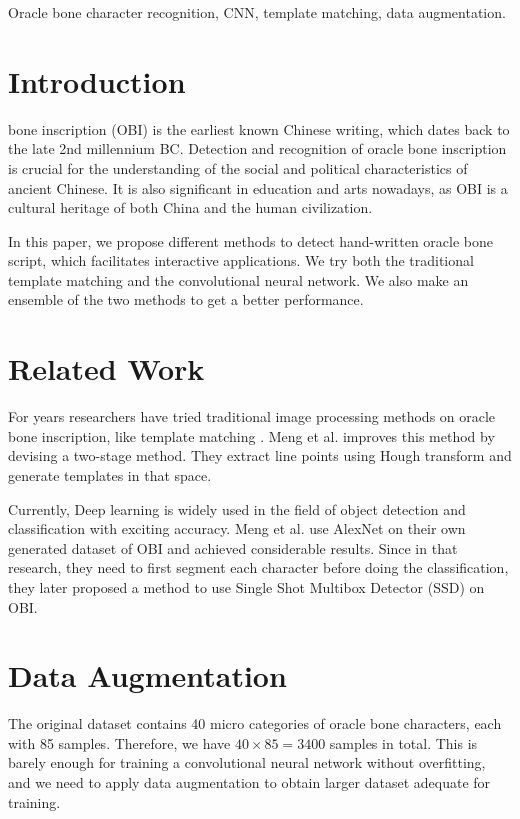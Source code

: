 \documentclass[journal]{IEEEtran}
\begin{document}
\begin{IEEEkeywords}
	Oracle bone character recognition, CNN, template matching, data augmentation.
\end{IEEEkeywords}


\IEEEpeerreviewmaketitle



\section{Introduction}
 bone inscription (OBI) is the earliest known Chinese writing, which dates back to the late 2nd millennium BC. Detection and recognition of oracle bone inscription is crucial for the understanding of the social and political characteristics of ancient Chinese. It is also significant in education and arts nowadays, as OBI is a cultural heritage of both China and the human civilization.

In this paper, we propose different methods to detect hand-written oracle bone script, which facilitates interactive applications. We try both the traditional template matching and the convolutional neural network. We also make an ensemble of the two methods to get a better performance.

\section{Related Work}
For years researchers have tried traditional image processing methods on oracle bone inscription, like template matching \cite{tm}. Meng et al. \cite{tm1} improves this method by devising a two-stage method. They extract line points using Hough transform and generate templates in that space. 

Currently, Deep learning is widely used in the field of object detection and classification with exciting accuracy. Meng et al. \cite{conv} use AlexNet on their own generated dataset of OBI and achieved considerable results. Since in that research, they need to first segment each character before doing the classification, they later proposed a method \cite{ssd} to use Single Shot Multibox Detector (SSD) on OBI.


\section{Data Augmentation}
The original dataset contains 40 micro categories of oracle bone characters, each with 85 samples.
Therefore, we have $40 \times 85 = 3400$ samples in total.
This is barely enough for training a convolutional neural network without overfitting, and we need to apply data augmentation to obtain larger dataset adequate for training.
\end{document}
